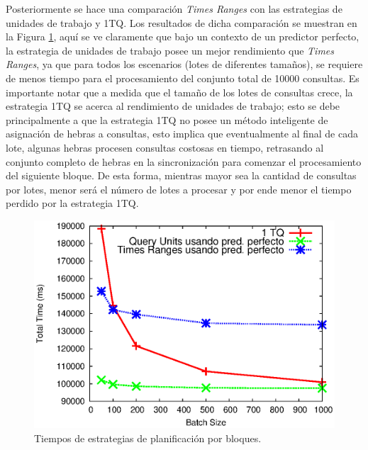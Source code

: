 
Posteriormente se hace una comparación \textit{Times Ranges} con las estrategias de unidades de trabajo y 1TQ. Los resultados de dicha comparación se muestran en la Figura \ref{fig:units_vs_multithread}, aquí se ve claramente que bajo un contexto de un predictor perfecto, la estrategia de unidades de trabajo posee un mejor rendimiento que \textit{Times Ranges}, ya que para todos los escenarios (lotes de diferentes tamaños), se requiere de menos tiempo para el procesamiento del conjunto total de 10000 consultas.
Es importante notar que a medida que el tamaño de los lotes de consultas crece, la estrategia 1TQ se acerca al rendimiento de unidades de trabajo; esto se debe principalmente a que la estrategia 1TQ no posee un método inteligente de asignación de hebras a consultas, esto implica que eventualmente al final de cada lote, algunas hebras procesen consultas costosas en tiempo, retrasando al conjunto completo de hebras en la sincronización para comenzar el procesamiento del siguiente bloque. De esta forma, mientras mayor sea la cantidad de consultas por lotes, menor será el número de lotes a procesar y por ende menor el tiempo perdido por la estrategia 1TQ.  

\begin{figure}[tp]
\centering
\includegraphics[scale=.75]{images/units_vs_multithread.eps}
\caption{Tiempos de estrategias de planificación por bloques.}
\label{fig:units_vs_multithread}
\end{figure}


